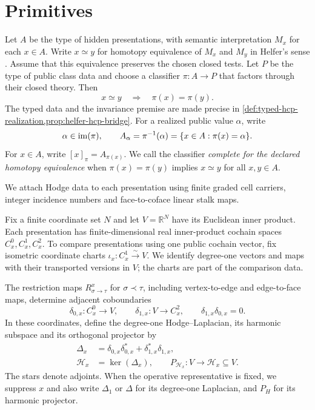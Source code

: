 \section{Primitives}\label{sec:primitives}

Let \(A\) be the type of hidden presentations, with semantic interpretation
\(M_x\) for each \(x\in A\). Write \(x\simeq y\) for homotopy equivalence
of \(M_x\) and \(M_y\) in Helfer's sense \cite[Definition~7.1]{helfer2019fol}.
Assume that this equivalence preserves the chosen closed tests. Let \(P\) be
the type of public class data and choose a classifier \(\pi:A\to P\) that factors through their
closed theory. Then
\[
  x\simeq y\quad\Longrightarrow\quad\pi(x)=\pi(y).
\]
The typed data and the invariance premise are made precise in
\cref{def:typed-hcp-realization,prop:helfer-hcp-bridge}.
For a realized public value \(\alpha\), write
\[
  \alpha\in\operatorname{im}(\pi),\qquad
  A_\alpha=\pi^{-1}(\alpha)=\{x\in A:\pi(x)=\alpha\}.
\]
For \(x\in A\), write \([x]_\pi=A_{\pi(x)}\). We call the classifier
\emph{complete for the declared homotopy equivalence} when
\(\pi(x)=\pi(y)\) implies \(x\simeq y\) for all \(x,y\in A\).

We attach Hodge data to each presentation using finite graded cell carriers,
integer incidence numbers and face-to-coface linear stalk maps.

Fix a finite coordinate set \(N\) and let \(V=\mathbb R^N\) have its Euclidean
inner product. Each presentation has finite-dimensional real inner-product
cochain spaces \(C_x^0,C_x^1,C_x^2\). To compare presentations using one public
cochain vector, fix isometric coordinate charts
\(\iota_x:C_x^1\overset{\sim}{\longrightarrow}V\).
We identify degree-one vectors and maps with their transported versions in
\(V\); the charts are part of the comparison data.

The restriction maps \(R^x_{\sigma\to\tau}\) for \(\sigma\prec\tau\),
including vertex-to-edge and edge-to-face maps, determine adjacent
coboundaries
\[
  \delta_{0,x}:C_x^0\to V,
  \qquad
  \delta_{1,x}:V\to C_x^2,
  \qquad
  \delta_{1,x}\delta_{0,x}=0.
\]
In these coordinates, define the degree-one Hodge--Laplacian, its harmonic
subspace and its orthogonal projector by
\[
\begin{aligned}
  \Delta_x&=\delta_{0,x}\delta_{0,x}^\ast+
    \delta_{1,x}^\ast\delta_{1,x},\\
  \mathcal H_x&=\ker(\Delta_x),\qquad
    P_{\mathcal H_x}:V\to\mathcal H_x\subseteq V.
\end{aligned}
\]
The stars denote adjoints. When the operative representative is fixed, we
suppress \(x\) and also write \(\Delta_1\) or \(\Delta\) for its degree-one
Laplacian, and \(P_H\) for its harmonic projector.

